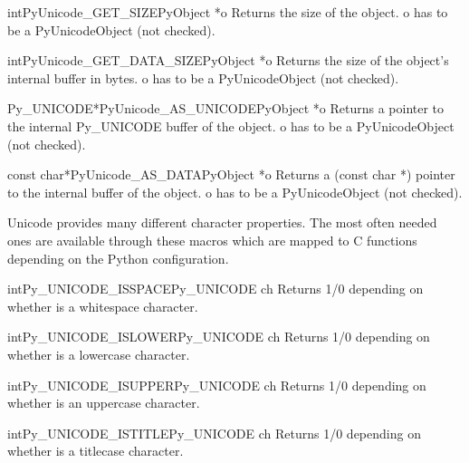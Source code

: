 \documentclass{manual}
\begin{document}
\begin{cfuncdesc}{int}{PyUnicode_GET_SIZE}{PyObject *o}
Returns the size of the object.  o has to be a
PyUnicodeObject (not checked).
\end{cfuncdesc}

\begin{cfuncdesc}{int}{PyUnicode_GET_DATA_SIZE}{PyObject *o}
Returns the size of the object's internal buffer in bytes. o has to be
a PyUnicodeObject (not checked).
\end{cfuncdesc}

\begin{cfuncdesc}{Py_UNICODE*}{PyUnicode_AS_UNICODE}{PyObject *o}
Returns a pointer to the internal Py_UNICODE buffer of the object. o
has to be a PyUnicodeObject (not checked).
\end{cfuncdesc}

\begin{cfuncdesc}{const char*}{PyUnicode_AS_DATA}{PyObject *o}
Returns a (const char *) pointer to the internal buffer of the object.
o has to be a PyUnicodeObject (not checked).
\end{cfuncdesc}


Unicode provides many different character properties. The most often
needed ones are available through these macros which are mapped to C
functions depending on the Python configuration.

\begin{cfuncdesc}{int}{Py_UNICODE_ISSPACE}{Py_UNICODE ch}
Returns 1/0 depending on whether  is a whitespace character.
\end{cfuncdesc}

\begin{cfuncdesc}{int}{Py_UNICODE_ISLOWER}{Py_UNICODE ch}
Returns 1/0 depending on whether  is a lowercase character.
\end{cfuncdesc}

\begin{cfuncdesc}{int}{Py_UNICODE_ISUPPER}{Py_UNICODE ch}
Returns 1/0 depending on whether  is an uppercase character.
\end{cfuncdesc}

\begin{cfuncdesc}{int}{Py_UNICODE_ISTITLE}{Py_UNICODE ch}
Returns 1/0 depending on whether  is a titlecase character.
\end{cfuncdesc}
\end{document}

